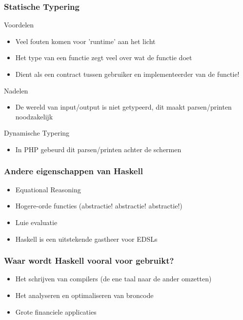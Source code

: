 \documentclass{beamer}
\begin{document}
\begin{frame}
    \frametitle{Statische Typering}
    \begin{block}{Voordelen}
        \begin{itemize}
            \item Veel fouten komen voor 'runtime' aan het licht
            \item Het type van een functie zegt veel over wat de functie doet
            \item Dient als een contract tussen gebruiker en implementeerder van de functie!
        \end{itemize}
    \end{block}
    \begin{block}{Nadelen}
        \begin{itemize}
            \item De wereld van input/output is niet getypeerd, dit maakt parsen/printen noodzakelijk
        \end{itemize}
    \end{block}
    \begin{block}{Dynamische Typering}
        \begin{itemize}
            \item In PHP gebeurd dit parsen/printen achter de schermen 
        \end{itemize}
    \end{block}
\end{frame}

\begin{frame}
    \frametitle{Andere eigenschappen van Haskell}
    \begin{itemize}
        \item Equational Reasoning
        \item Hogere-orde functies (abstractie! abstractie! abstractie!)
        \item Luie evaluatie
        \item Haskell is een uitstekende gastheer voor EDSLs
    \end{itemize}
\end{frame}

\begin{frame}
    \frametitle{Waar wordt Haskell vooral voor gebruikt?}
    \begin{itemize}
        \item Het schrijven van compilers (de ene taal naar de ander omzetten)
        \item Het analyseren en optimaliseren van broncode
        \item Grote financiele applicaties
    \end{itemize}
\end{frame}
\end{document}
